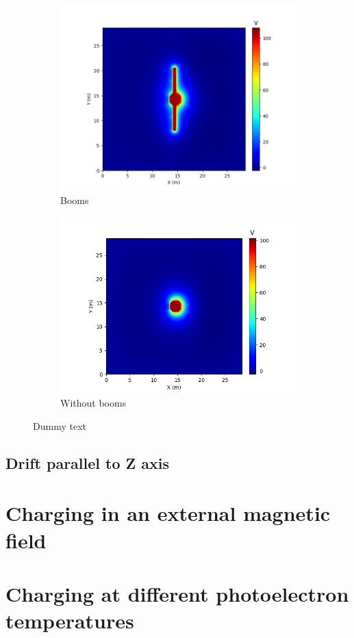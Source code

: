 \begin{center}
\begin{figure}[H]
  \begin{subfigure}[b]{0.61\textwidth}
    \includegraphics[width=\textwidth]{figures/MMO/plusX/Booms/AvgAfter1000BoomsPlusX.png}
    \caption{Booms}
    \label{fig:AvgAfter1000BoomsPlusX}
  \end{subfigure}
  \hfill
  \begin{subfigure}[b]{0.61\textwidth}
    \includegraphics[width=\textwidth]{figures/MMO/plusX/noBooms/AvgAfter1000noBoomsPlusX.png}
    \caption{Without booms}
    \label{fig:AvgAfter1000noBoomsPlusX}
  \end{subfigure}
  \label{fig:AvgPhiDriftX}
  \caption{Dummy text}
\end{figure}
\end{center}



\subsection*{Drift parallel to Z axis}


\section{Charging in an external magnetic field}

\section{Charging at different photoelectron temperatures}